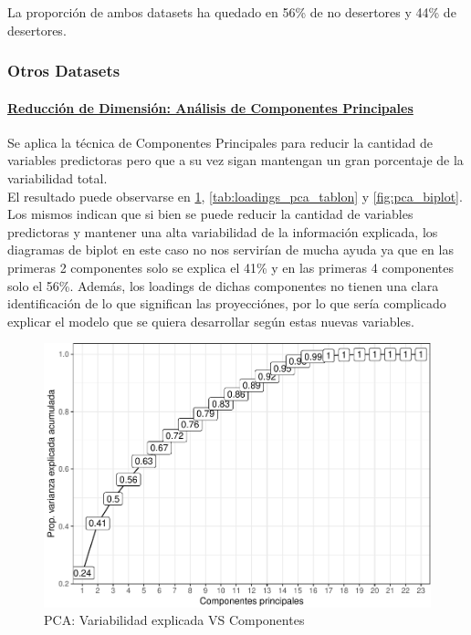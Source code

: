 La proporción de ambos datasets ha quedado en 56\% de no desertores y 44\% de desertores.



\subsubsection{Otros Datasets}

\paragraph{\textbf{\underline{Reducción de Dimensión: Análisis de Componentes Principales}}}\label{anuxe1lisis-de-componentes-principales}

Se aplica la técnica de Componentes Principales para reducir la cantidad de variables predictoras pero que a su vez sigan mantengan un gran porcentaje de la variabilidad total.\\
El resultado puede observarse en \ref{fig:pca_varexp_comp}, \ref{tab:loadings_pca_tablon} y \ref{fig:pca_biplot}. Los mismos indican que si bien se puede reducir la cantidad de variables
predictoras y mantener una alta variabilidad de la información
explicada, los diagramas de biplot en este caso no nos servirían de
mucha ayuda ya que en las primeras 2 componentes solo se explica el 41\%
y en las primeras 4 componentes solo el 56\%. Además, los loadings de
dichas componentes no tienen una clara identificación de lo que significan las proyecciónes, por lo que sería complicado explicar el modelo que se quiera desarrollar según estas nuevas variables.

\begin{figure}[!htb]
	\centering
	\includegraphics{imagenes/reduccion_dimension/unnamed-chunk-7-1.pdf}
	\caption{PCA: Variabilidad explicada VS Componentes}
	\label{fig:pca_varexp_comp}
\end{figure}



